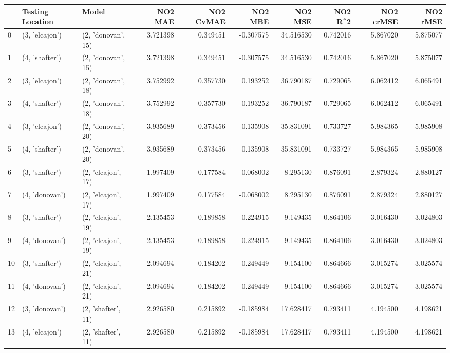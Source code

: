 \begin{tabular}{lllrrrrrrr}
\toprule
{} & Testing Location &               Model &   NO2 MAE &  NO2 CvMAE &   NO2 MBE &    NO2 MSE &   NO2 R\textasciicircum2 &  NO2 crMSE &  NO2 rMSE \\
\midrule
0  &   (3, 'elcajon') &  (2, 'donovan', 15) &  3.721398 &   0.349451 & -0.307575 &  34.516530 &  0.742016 &   5.867020 &  5.875077 \\
1  &   (4, 'shafter') &  (2, 'donovan', 15) &  3.721398 &   0.349451 & -0.307575 &  34.516530 &  0.742016 &   5.867020 &  5.875077 \\
2  &   (3, 'elcajon') &  (2, 'donovan', 18) &  3.752992 &   0.357730 &  0.193252 &  36.790187 &  0.729065 &   6.062412 &  6.065491 \\
3  &   (4, 'shafter') &  (2, 'donovan', 18) &  3.752992 &   0.357730 &  0.193252 &  36.790187 &  0.729065 &   6.062412 &  6.065491 \\
4  &   (3, 'elcajon') &  (2, 'donovan', 20) &  3.935689 &   0.373456 & -0.135908 &  35.831091 &  0.733727 &   5.984365 &  5.985908 \\
5  &   (4, 'shafter') &  (2, 'donovan', 20) &  3.935689 &   0.373456 & -0.135908 &  35.831091 &  0.733727 &   5.984365 &  5.985908 \\
6  &   (3, 'shafter') &  (2, 'elcajon', 17) &  1.997409 &   0.177584 & -0.068002 &   8.295130 &  0.876091 &   2.879324 &  2.880127 \\
7  &   (4, 'donovan') &  (2, 'elcajon', 17) &  1.997409 &   0.177584 & -0.068002 &   8.295130 &  0.876091 &   2.879324 &  2.880127 \\
8  &   (3, 'shafter') &  (2, 'elcajon', 19) &  2.135453 &   0.189858 & -0.224915 &   9.149435 &  0.864106 &   3.016430 &  3.024803 \\
9  &   (4, 'donovan') &  (2, 'elcajon', 19) &  2.135453 &   0.189858 & -0.224915 &   9.149435 &  0.864106 &   3.016430 &  3.024803 \\
10 &   (3, 'shafter') &  (2, 'elcajon', 21) &  2.094694 &   0.184202 &  0.249449 &   9.154100 &  0.864666 &   3.015274 &  3.025574 \\
11 &   (4, 'donovan') &  (2, 'elcajon', 21) &  2.094694 &   0.184202 &  0.249449 &   9.154100 &  0.864666 &   3.015274 &  3.025574 \\
12 &   (3, 'donovan') &  (2, 'shafter', 11) &  2.926580 &   0.215892 & -0.185984 &  17.628417 &  0.793411 &   4.194500 &  4.198621 \\
13 &   (4, 'elcajon') &  (2, 'shafter', 11) &  2.926580 &   0.215892 & -0.185984 &  17.628417 &  0.793411 &   4.194500 &  4.198621 \\

\end{tabular}
